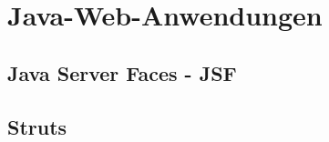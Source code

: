 \section{Java-Web-Anwendungen} \label{sec:tech-WebAnwendungen}
		\subsection{Java Server Faces - JSF}
		\subsection{Struts}

	